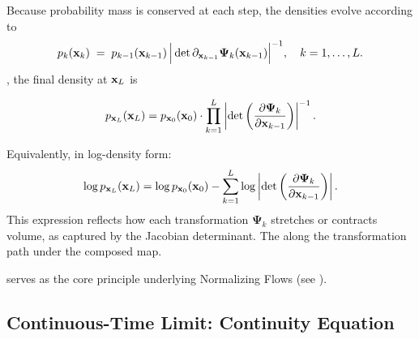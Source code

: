 Because probability mass is conserved at each step, the densities evolve according to
\[
p_{k}({\mathbf{x}}_k) \;=\; p_{k-1}({\mathbf{x}}_{k-1}) \,
   \Big|\det \partial_{{\mathbf{x}}_{k-1}} \bm{\Psi}_k({\mathbf{x}}_{k-1})\Big|^{-1},
   \quad k=1,\dots,L.
\]
, the final density at ${\mathbf{x}}_L$ is
\begin{mdframed}
\begin{align}\label{eq:cov-multi-layer-nolog}
    p_{{\mathbf{x}}_L}({\mathbf{x}}_L) 
    = p_{{\mathbf{x}}_0}({\mathbf{x}}_0) 
    \cdot \prod_{k=1}^L \left| \det \left( \frac{\partial \bm{\Psi}_k}{\partial {\mathbf{x}}_{k-1}} \right) \right|^{-1}.
\end{align}
\end{mdframed}
Equivalently, in log-density form:
\begin{align*}
    \log p_{{\mathbf{x}}_L}({\mathbf{x}}_L) 
    = \log p_{{\mathbf{x}}_0}({\mathbf{x}}_0) 
    - \sum_{k=1}^L \log \left| \det \left( \frac{\partial \bm{\Psi}_k}{\partial {\mathbf{x}}_{k-1}} \right) \right|.
\end{align*}
This expression reflects how each transformation $\bm{\Psi}_k$ stretches or contracts volume, as captured by the Jacobian determinant. The  along the transformation path  under the composed map.

 serves as the core principle underlying Normalizing Flows (see ).

\clearpage
\newpage

\subsection{Continuous-Time Limit: Continuity Equation}\label{subsec:cov-continuity-eq} 



